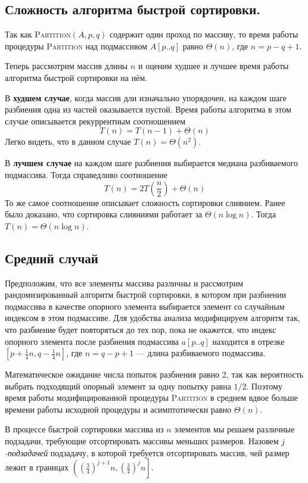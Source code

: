 \documentclass[a4paper,12pt]{article}
\newcommand{\algname}[1]{\textsc{#1}}
\begin{document}
\subsection{Сложность алгоритма быстрой сортировки.}

Так как \algname{Partition}\((A, p, q)\) содержит один проход по массиву, то время работы процедуры \algname{Partition} над подмассивом \(A[p..q]\) равно \(\Theta(n)\),
где \(n = p - q + 1\).

Теперь рассмотрим массив длины \(n\) и оценим худшее и лучшее время работы алгоритма быстрой сортировки на нём.

В \textbf{худшем случае}, когда массив дли изначально упорядочен, на каждом шаге разбиения одна из частей оказывается пустой. Время работы алгоритма в этом случае описывается рекуррентным соотношением \[T(n) = T(n-1) + \Theta(n)\]
Легко видеть, что в данном случае \(T(n) = \Theta(n^2)\).

В \textbf{лучшем случае} на каждом шаге разбиения выбирается медиана разбиваемого подмассива. Тогда справедливо соотношение
\[T(n) = 2T\left(\frac{n}{2}\right) + \Theta(n)\]
То же самое соотношение описывает сложность сортировки слиянием. Ранее было доказано, что сортировка слияниями работает за \(\Theta(n \log n)\). Тогда \(T(n) = \Theta(n\log n)\).


\subsection{Средний случай}
Предположим, что все элементы массива различны и рассмотрим рандомизированный алгоритм быстрой сортировки, в котором при разбиении подмассива в качестве опорного элемента  выбирается элемент со случайным индексом в этом подмассиве. Для удобства анализа модифицируем алгоритм так, что разбиение будет повторяться до тех пор, пока не окажется, что индекс опорного элемента после разбиения подмассива $a[p..q]$ находится в отрезке $[p + \frac{1}{4}n, q - \frac{1}{4}n]$, где $n = q - p + 1$ --- длина разбиваемого подмассива.

Математическое ожидание числа попыток разбиения равно 2, так как вероятность выбрать подходящий опорный элемент за одну попытку равна $1/2$. Поэтому время работы модифицированной процедуры \algname{Partition} в среднем вдвое больше времени работы исходной процедуры и асимптотически равно $\Theta(n)$.

В процессе быстрой сортировки массива из $n$ элементов мы решаем различные подзадачи, требующие отсортировать массивы меньших размеров. Назовем \emph{$j$-подзадачей} подзадачу, в которой требуется отсортировать массив, чей размер лежит в границах $\left(\left(\frac{3}{4}\right)^{j+1} n, \left(\frac{3}{4}\right)^{j} n\right]$.
\end{document}
